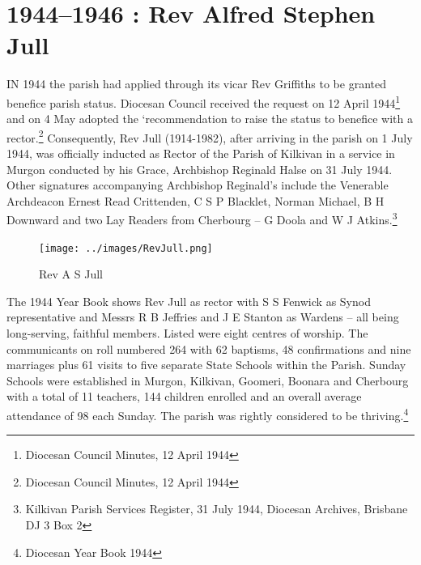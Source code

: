 \balance


\printendnotes[custom]
\setcounter{endnote}{0}
\chapter{1944--1946 : Rev Alfred Stephen Jull}
\nobalance


\lettrine[lines=3]{I}{N}
 1944 the parish had applied through its vicar Rev Griffiths to be granted benefice parish status. Diocesan Council received the request on 12 April 1944\footnote{Diocesan Council Minutes, 12 April 1944} and on 4 May adopted the `recommendation to raise the status to benefice with a rector.\footnote{Diocesan Council Minutes, 12 April 1944} Consequently, Rev Jull (1914-1982), after arriving in the parish on 1 July 1944, was officially inducted as Rector of the Parish of Kilkivan in a service in Murgon conducted by his Grace, Archbishop Reginald Halse on 31 July 1944. Other signatures accompanying Archbishop Reginald's include the Venerable Archdeacon Ernest Read Crittenden, C S P Blacklet, Norman Michael, B H Downward and two Lay Readers from Cherbourg -- G Doola and W J Atkins.\footnote{Kilkivan Parish Services Register, 31 July 1944, Diocesan Archives, Brisbane DJ 3 Box 2}







\begin{figure}
\begin{center}
\texttt{[image: ../images/RevJull.png]}
\caption{Rev A S Jull}
\end{center}
\end{figure}




The 1944 Year Book shows Rev Jull as rector with S S Fenwick as Synod representative and Messrs R B Jeffries and J E Stanton as Wardens -- all being long-serving, faithful members. Listed were eight centres of worship. The communicants on roll numbered 264 with 62 baptisms, 48 confirmations and nine marriages plus 61 visits to five separate State Schools within the Parish. Sunday Schools were established in Murgon, Kilkivan, Goomeri, Boonara and Cherbourg with a total of 11 teachers, 144 children enrolled and an overall average attendance of 98 each Sunday. The parish was rightly considered to be thriving.\footnote{Diocesan Year Book 1944}


